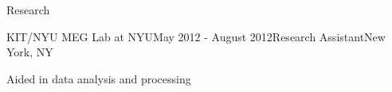 \documentclass{resume} %
\begin{document}
\begin{rSection}{Research}
\begin{rSubsection}{KIT/NYU MEG Lab at NYU}{May 2012 - August 2012}{Research Assistant}{New York, NY}
\item Aided in data analysis and processing
\end{rSubsection}


\end{rSection}




\end{document}
